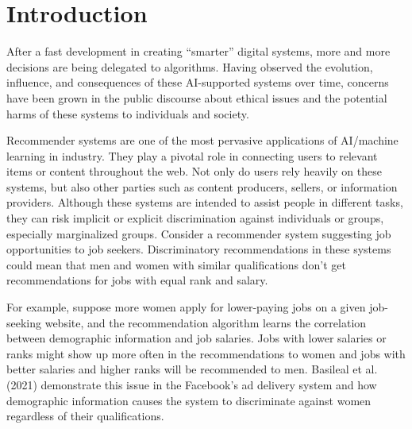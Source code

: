 \chapter{Introduction}
\label{ch:intro}




After a fast development in creating ``smarter'' digital systems, more and more decisions are being delegated to algorithms. Having observed the evolution, influence, and consequences of these AI-supported systems over time, concerns have been grown in the public discourse about ethical issues and the potential harms of these systems to individuals and society. 
 
Recommender systems are one of the most pervasive applications of AI/machine learning in industry. They play a pivotal role in connecting users to relevant items or content throughout the web. Not only do users rely heavily on these systems, but also other parties such as content producers, sellers, or information providers. Although these systems are intended to assist people in different tasks, they can risk implicit or explicit discrimination against individuals or groups, especially marginalized groups. Consider a recommender system suggesting job opportunities to job seekers. Discriminatory recommendations in these systems could mean that men and women with similar qualifications don't get recommendations for jobs with equal rank and salary.



For example, suppose more women apply for lower-paying jobs on a given job-seeking website, and the recommendation algorithm learns the correlation between demographic information and job salaries. Jobs with lower salaries or ranks might show up more often in the recommendations to women and jobs with better salaries and higher ranks will be recommended to men. Basileal et al. (2021) \cite{Korolova2021JobAds} demonstrate this issue in the Facebook's ad delivery system and how demographic information causes the system to discriminate against women regardless of their qualifications.

